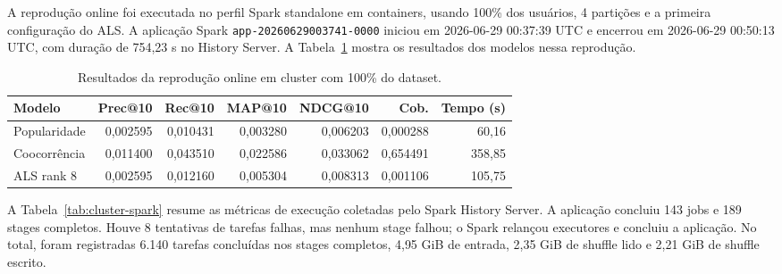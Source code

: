 \documentclass[12pt]{article}
\begin{document}
A reprodu\c{c}\~ao online foi executada no perfil Spark standalone em
containers, usando 100\% dos usu\'arios, 4 parti\c{c}\~oes e a primeira
configura\c{c}\~ao do ALS. A aplica\c{c}\~ao Spark
\texttt{app-20260629003741-0000} iniciou em 2026-06-29 00:37:39 UTC e
encerrou em 2026-06-29 00:50:13 UTC, com dura\c{c}\~ao de 754{,}23 s no
History Server. A Tabela~\ref{tab:cluster-modelos} mostra os resultados dos
modelos nessa reprodu\c{c}\~ao.

\begin{table}[!htbp]
\centering
\caption{Resultados da reprodu\c{c}\~ao online em cluster com 100\% do dataset.}
\label{tab:cluster-modelos}
\begin{tabular}{lrrrrrr}
\toprule
Modelo & Prec@10 & Rec@10 & MAP@10 & NDCG@10 & Cob. & Tempo (s) \\
\midrule
Popularidade & 0{,}002595 & 0{,}010431 & 0{,}003280 & 0{,}006203 & 0{,}000288 & 60{,}16 \\
Coocorr\^encia & 0{,}011400 & 0{,}043510 & 0{,}022586 & 0{,}033062 & 0{,}654491 & 358{,}85 \\
ALS rank 8 & 0{,}002595 & 0{,}012160 & 0{,}005304 & 0{,}008313 & 0{,}001106 & 105{,}75 \\
\bottomrule
\end{tabular}
\end{table}

A Tabela~\ref{tab:cluster-spark} resume as m\'etricas de execu\c{c}\~ao
coletadas pelo Spark History Server. A aplica\c{c}\~ao concluiu 143 jobs e 189
stages completos. Houve 8 tentativas de tarefas falhas, mas nenhum stage
falhou; o Spark relan\c{c}ou executores e concluiu a aplica\c{c}\~ao. No total,
foram registradas 6.140 tarefas conclu\'idas nos stages completos, 4{,}95 GiB
de entrada, 2{,}35 GiB de shuffle lido e 2{,}21 GiB de shuffle escrito.
\end{document}
